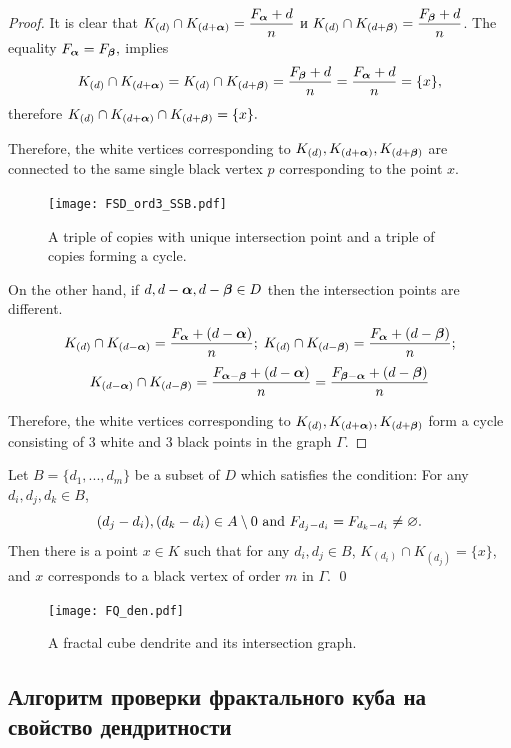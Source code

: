 \begin{proof}
It is clear that $K_{(d)}\cap K_{(d+{\bm{\alpha}})}=\dfrac{F_{\bm{\alpha}}+d}{n}$ и $K_{(d)}\cap K_{(d+{\bm{\beta}})}=\dfrac{F_{\bm{\beta}}+d}{n}$.
The equality $F_{\bm{\alpha}}=F_{\bm{\beta}},$ implies 
$$K_{(d)}\cap K_{(d+{\bm{\alpha}})}=K_{(d)}\cap K_{(d+{\bm{\beta}})}=\dfrac{F_{\bm{\beta}}+d}{n}=\dfrac{F_{\bm{\alpha}}+d}{n}=\{x\},$$
therefore $K_{(d)}\cap K_{(d+{\bm{\alpha}})}\cap K_{(d+{\bm{\beta}})}=\{x\}.$

Therefore, the white vertices corresponding to $K_{(d)}, K_{(d+{\bm{\alpha}})}, K_{(d+{\bm{\beta}})}$ are connected to the same single black vertex $p$ corresponding to the point $x$.

\begin{figure}[H]
    \centering
    \texttt{[image: FSD\_ord3\_SSB.pdf]}
    \caption{A triple of copies with unique intersection point and a triple of copies forming a cycle.}
\end{figure}

On the other hand, if $d, d-{\bm{\alpha}}, d-{\bm{\beta}}\in D$ then the intersection points are different. 
$$  K_{(d)}\cap K_{(d-{\bm{\alpha}})}=\dfrac{F_{\bm{\alpha}}+(d-{\bm{\alpha}})}{n};\;
    K_{(d)}\cap K_{(d-{\bm{\beta}})}=\dfrac{F_{\bm{\alpha}}+(d-{\bm{\beta}})}{n};$$
$$  K_{(d-{\bm{\alpha}})}\cap K_{(d-{\bm{\beta}})}=\dfrac{F_{{\bm{\alpha}}-{\bm{\beta}}}+(d-{\bm{\alpha}})}{n}=\dfrac{F_{{\bm{\beta}}-{\bm{\alpha}}}+(d-{\bm{\beta}})}{n}$$

Therefore, the white vertices corresponding to $K_{(d)}, K_{(d+{\bm{\alpha}})}, K_{(d+{\bm{\beta}})}$ form a cycle consisting of 3 white and 3 black points in the graph $\Gamma$.
\end{proof}

\begin{corollary}\label{mpoint}
Let $ B=\{d_1,...,d_m\}$ be a subset of $D$ which satisfies the condition:
For any $d_i,d_j,d_k\in B$, $$(d_j-d_i),(d_k-d_i)\in A\setminus0\text{ and } F_{d_j-d_i}=F_{d_k-d_i}\neq\varnothing.$$
Then there is a point $x\in K$ such that for any $d_i,d_j\in B$, $K_{(d_i)}\cap K_{(d_j)}=\{x\}$, and $x$ corresponds to a black vertex of order $m$ in $\Gamma$.
\qed
\end{corollary}

\begin{figure}[H]
    \centering
\texttt{[image: FQ\_den.pdf]}
    \caption{A fractal cube dendrite and its intersection graph.\cite{BMM2022}}
    \label{fig:enter-label}
\end{figure}

\subsection{Алгоритм проверки фрактального куба на свойство дендритности}

